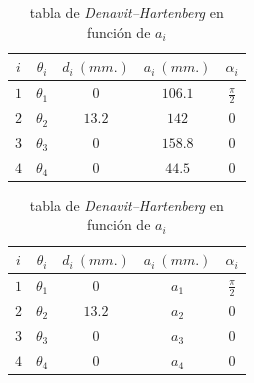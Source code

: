 \documentclass[a4paper,12pt]{article}
\begin{document}
\begin{table}[H]
    \parbox{.45\linewidth}{
        \centering
        \begin{tabular}{ c | c c c c }
            $i$ & $\theta_i$ & $d_i~(mm.)$ & $a_i~(mm.)$ & $\alpha_i$ \\ [0.5ex]
            \hline
            $1$ & $\theta_1$ & $0$ & $106.1$ & $\frac{\pi}{2}$ \\
            $2$ & $\theta_2$ & $13.2$ & $142$ & $0$ \\
            $3$ & $\theta_3$ & $0$ & $158.8$ & $0$ \\
            $4$ & $\theta_4$ & $0$ & $44.5$ & $0$ \\ [1ex]
        \end{tabular}
        \caption{tabla de \textit{Denavit–Hartenberg}}
    }
    \hfill
    \parbox{.45\linewidth}{
        \centering
        \begin{tabular}{ c | c c c c }
            $i$ & $\theta_i$ & $d_i~(mm.)$ & $a_i~(mm.)$ & $\alpha_i$ \\ [0.5ex]
            \hline
            $1$ & $\theta_1$ & $0$ & $a_1$ & $\frac{\pi}{2}$ \\
            $2$ & $\theta_2$ & $13.2$ & $a_2$ & $0$ \\
            $3$ & $\theta_3$ & $0$ & $a_3$ & $0$ \\
            $4$ & $\theta_4$ & $0$ & $a_4$ & $0$ \\ [1ex]
        \end{tabular}
        \caption{tabla de \textit{Denavit–Hartenberg} en función de $a_i$}
    }
\end{table}

\newpage
\printbibliography
\end{document}
